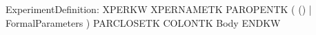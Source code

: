 %
%
%
\begin{rail}
ExperimentDefinition: XPERKW XPERNAMETK
                      PAROPENTK ( () | FormalParameters ) PARCLOSETK
                      COLONTK Body ENDKW
\end{rail}

